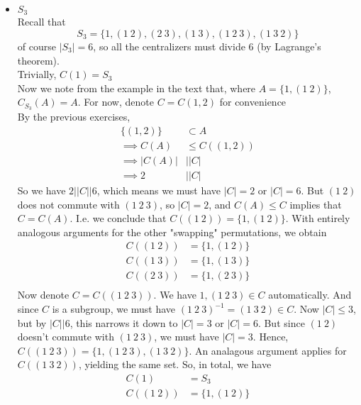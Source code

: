 \documentclass{article}
\newcommand{\set}[1]{ \{ #1 \} }
\newcommand{\inv}[1]{ {#1}^{-1} }
\newcommand{\norm}[1]{|#1|}
\newcommand{\divides}{\vert}
\begin{document}
\subsubsection{}\label{ex2p4}
\begin{itemize}
\item $S_3$\\
Recall that
\begin{equation}
S_3 = \set{1,(1\ 2),(2\ 3),(1\ 3),(1\ 2\ 3),(1\ 3\ 2)}
\end{equation}
of course $|S_3| = 6$, so all the centralizers must divide $6$ (by Lagrange's theorem). \\
Trivially, $C(1) = S_3$\\
Now we note from the example in the text that, where $A=\set{1, (1\ 2)}$,  $C_{S_3}(A) = A$. For now, denote $C=C(1,2)$ for convenience\\
By the previous exercises,
\begin{align*}
\set{(1,2)} &\subset A\\
\implies C(A) &\leq C((1,2))\\
\implies \norm{C(A)} &\vert \norm{C}\\
\implies 2 &\vert \norm{C}
\end{align*}
So we have $2\vert\norm{C}\vert 6$, which means we must have $\norm{C}=2$ or $\norm{C}=6$. But $(1\ 2)$ does not commute with $(1\ 2\ 3)$, so $\norm{C}=2$, and $C(A) \leq C$ implies that $C = C(A)$. I.e. we conclude that $C( (1\ 2) ) = \set{1, (1\ 2)}$. With entirely analogous arguments for the other "swapping" permutations, we obtain
\begin{align*}
C( (1\ 2) ) &= \set{1, (1\ 2)}\\
C( (1\ 3) ) &= \set{1, (1\ 3)}\\
C( (2\ 3) ) &= \set{1, (2\ 3)}\\
\end{align*}
Now denote $C = C( (1\ 2\ 3) )$. We have $1, (1\ 2\ 3) \in C$ automatically. And since $C$ is a subgroup, we must have $\inv{(1\ 2\ 3)} = (1\ 3\ 2) \in C$. Now $\norm{C} \leq 3$, but by $\norm{C} \divides 6$, this narrows it down to $\norm{C} = 3$ or $\norm{C} = 6$. But since $(1\ 2)$ doesn't commute with $(1\ 2\ 3)$, we must have $\norm{C} = 3$. Hence, $C( (1\ 2\ 3) ) = \set{1, (1\ 2\ 3), (1\ 3\ 2)}$. An analagous argument applies for $C( (1\ 3\ 2) )$, yielding the same set. So, in total, we have
\begin{align*}
C(1) &= S_3\\
C( (1\ 2) ) &= \set{1, (1\ 2)}\\

\end{align*}
\end{itemize}
\end{document}
